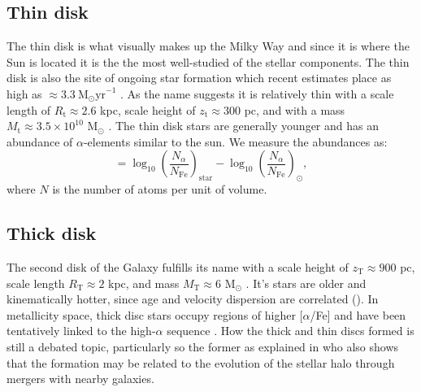 \subsection{Thin disk}
The thin disk is what visually makes up the Milky Way and since it is where the Sun is located it is the the most well-studied of the stellar components. The thin disk is also the site of ongoing star formation which recent estimates place as high as $\approx 3.3\ \mathrm{M_\odot yr}^{-1}$ \citep{zari:22}. As the name suggests it is relatively thin with a scale length of $R_\mathrm{t} \approx 2.6$ kpc, scale height of $z_\mathrm{t} \approx 300$ pc, and with a mass $M_\mathrm{t} \approx 3.5\times 10^10$ M$_\odot$ \citep{bland-hawthorn:16}. The thin disk stars are generally younger and has an abundance of $\alpha$-elements similar to the sun. We measure the abundances as:
\begin{equation}
    [\alpha/\mathrm{Fe}] = \log_{10}\left(\frac{N_\alpha}{N_\mathrm{Fe}}\right)_\mathrm{star} - \log_{10}\left(\frac{N_\alpha}{N_\mathrm{Fe}}\right)_\odot,
\end{equation}
where $N$ is the number of atoms per unit of volume.

\subsection{Thick disk}
The second disk of the Galaxy fulfills its name with a scale height of $z_\mathrm{T}\approx 900$ pc, scale length $R_\mathrm{T} \approx 2$ kpc, and mass $M_\mathrm{T} \approx 6$ M$_\odot$ \citep{bland-hawthorn:16}. It's stars are older \citep{martig:16} and kinematically hotter, since age and velocity dispersion are correlated (\citealt{martig:14,aumer:16}). In metallicity space, thick disc stars occupy regions of higher [$\alpha$/Fe] and have been tentatively linked to the high-$\alpha$ sequence \citep{katz:21}. How the thick and thin discs formed is still a debated topic, particularly so the former as explained in \cite{helmi:20} who also shows that the formation may be related to the evolution of the stellar halo through mergers with nearby galaxies. 

